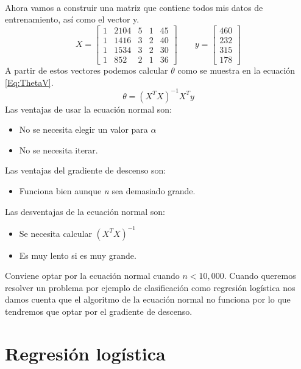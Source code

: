 \documentclass{report}
\begin{document}
\\Ahora vamos a construir una matriz que contiene todos mis datos de entrenamiento, así como el vector y.
\[X=\left[
\begin{array}{ccccc}
	1&2104&5&1&45\\
	1&1416&3&2&40\\
	1&1534&3&2&30\\
	1&852&2&1&36
\end{array}
\right]
\qquad
y=\left[
\begin{array}{c}
460\\232\\315\\178
\end{array}
\right]
\]
A partir de estos vectores podemos calcular $\theta$ como se muestra en la ecuación \ref{Eq:ThetaV}. 
\begin{equation}
	\theta = (X^TX)^{-1}X^Ty
	\label{Eq:ThetaV}
\end{equation}
Las ventajas de usar la ecuación normal son:
\begin{itemize}
	\item No se necesita elegir un valor para $\alpha$
	\item No se necesita iterar.
\end{itemize}
Las ventajas del gradiente de descenso son:
\begin{itemize}
	\item Funciona bien aunque \textit{n} sea demasiado grande.
\end{itemize}
Las desventajas de la ecuación normal son:
\begin{itemize}
	\item Se necesita calcular $(X^TX)^{-1}$
	\item Es muy lento si  es muy grande.
\end{itemize}
Conviene optar por la ecuación normal cuando $n<10,000$. Cuando queremos resolver un problema por ejemplo de clasificación como regresión logística nos damos cuenta que el algoritmo de la ecuación normal no funciona por lo que tendremos que optar por el gradiente de descenso.

\chapter{Regresión logística}
\end{document}
